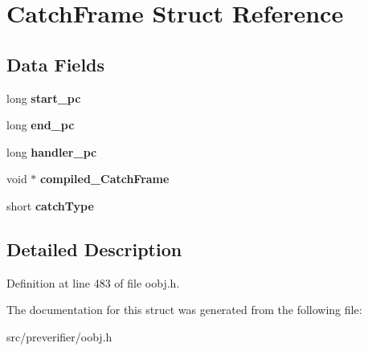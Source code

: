 \section{CatchFrame Struct Reference}
\label{struct_catch_frame}
\subsection*{Data Fields}
\begin{DoxyCompactItemize}
\item 
long {\bfseries start\_\-pc}\label{struct_catch_frame_ae943f5a8c7d70fbfd503e5a385922062}

\item 
long {\bfseries end\_\-pc}\label{struct_catch_frame_a6ce8f145cb6614bd2408bab0418445f6}

\item 
long {\bfseries handler\_\-pc}\label{struct_catch_frame_a094abfc6b842925bc2c33b8aecfc6058}

\item 
void $\ast$ {\bfseries compiled\_\-CatchFrame}\label{struct_catch_frame_a76e3411fcfd4c014fd7923283ff3b21b}

\item 
short {\bfseries catchType}\label{struct_catch_frame_aac22b18719093eff09ccd5447b761a0b}

\end{DoxyCompactItemize}


\subsection{Detailed Description}


Definition at line 483 of file oobj.h.



The documentation for this struct was generated from the following file:\begin{DoxyCompactItemize}
\item 
src/preverifier/oobj.h\end{DoxyCompactItemize}
